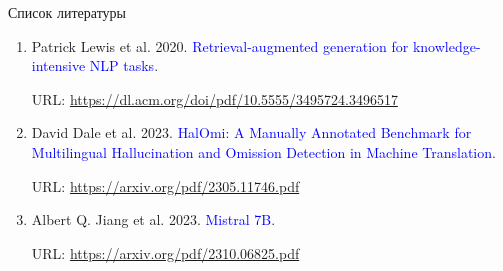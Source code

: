 \documentclass{beamer}
\begin{document}
\begin{frame}{Список литературы}
\begin{enumerate}
    \item Patrick Lewis et al. 2020. \textcolor{blue}{Retrieval-augmented generation for knowledge-intensive NLP tasks}. %
    
    URL: \url{https://dl.acm.org/doi/pdf/10.5555/3495724.3496517}

    \item David Dale et al. 2023. \textcolor{blue}{HalOmi: A Manually Annotated Benchmark for Multilingual Hallucination and Omission Detection in Machine Translation}.
    
    URL: \url{https://arxiv.org/pdf/2305.11746.pdf}


    \item Albert Q. Jiang et al. 2023. \textcolor{blue}{Mistral 7B}.
    
    URL: \url{https://arxiv.org/pdf/2310.06825.pdf}

  \end{enumerate}
\end{frame}
\end{document}
